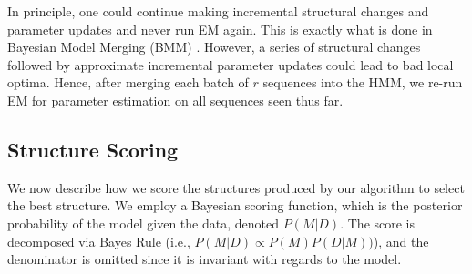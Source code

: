\documentclass[letterpaper]{article}
\begin{document}
In principle, one could continue making incremental structural changes and
parameter updates and never run EM again. This is exactly
what is done in
Bayesian Model Merging (BMM) \cite{stolcke1994best}.
However, a series of structural changes followed
by approximate incremental parameter updates could lead to bad
local optima. Hence, after merging each batch of $r$ sequences into the HMM,  we
re-run EM for parameter estimation on all sequences seen thus far.









\subsection{Structure Scoring}
\label{sec:fb}

We now describe how we score the structures produced by our algorithm to select the best structure.
We employ a Bayesian scoring function, which is
the posterior probability of the model given the data, denoted $P(M|D)$.  The score is decomposed via Bayes Rule (i.e., $P(M|D) \propto P(M) P(D|M))$), and the denominator is omitted since it is invariant with regards to the model.
\end{document}
